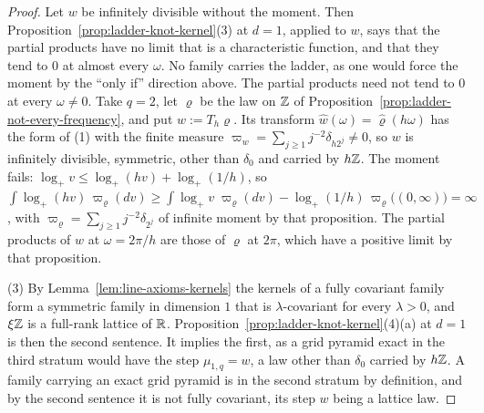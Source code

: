 \begin{proof}
Let $w$ be infinitely divisible without the moment. Then
Proposition~\ref{prop:ladder-knot-kernel}(3) at $d = 1$, applied to $w$, says that the partial
products have no limit that is a characteristic function, and that they tend to $0$ at almost
every $\omega$. No family
carries the ladder, as one would force the moment by the ``only if'' direction above. The partial
products need not tend to $0$ at every $\omega \ne 0$. Take $q = 2$, let $\varrho$ be the law on
$\mathbb{Z}$ of Proposition~\ref{prop:ladder-not-every-frequency}, and put
$w := T_h\varrho$. Its transform $\widehat w(\omega) = \widehat\varrho(h\omega)$ has the form of
(1) with the finite measure $\varpi_w = \sum_{j \ge 1}j^{-2}\delta_{h2^j} \ne 0$, so $w$ is
infinitely divisible, symmetric, other than $\delta_0$ and carried by $h\mathbb{Z}$. The moment fails:
$\log_+v \le \log_+(hv) + \log_+(1/h)$, so
$\int\log_+(hv)\,\varpi_\varrho(dv) \ge \int\log_+v\;\varpi_\varrho(dv) -
\log_+(1/h)\,\varpi_\varrho\bigl((0,\infty)\bigr) = \infty$, with $\varpi_\varrho = \sum_{j \ge
1}j^{-2}\delta_{2^j}$ of infinite moment by that proposition. The partial products of $w$ at
$\omega = 2\pi/h$ are those of $\varrho$ at $2\pi$, which have a positive limit by that
proposition.

(3) By Lemma~\ref{lem:line-axioms-kernels} the kernels of a fully covariant family form a
symmetric family in dimension $1$ that is $\lambda$-covariant for every $\lambda > 0$, and $\xi\mathbb{Z}$
is a full-rank lattice of $\mathbb{R}$. Proposition~\ref{prop:ladder-knot-kernel}(4)(a) at $d = 1$ is
then the second sentence. It implies
the first, as a grid pyramid exact in the third stratum would have the step $\mu_{1,q} = w$, a law
other than $\delta_0$ carried by $h\mathbb{Z}$. A family carrying an exact grid pyramid is in the second
stratum by definition, and by the second sentence it is not fully covariant, its step $w$ being a
lattice law.


\end{proof}
